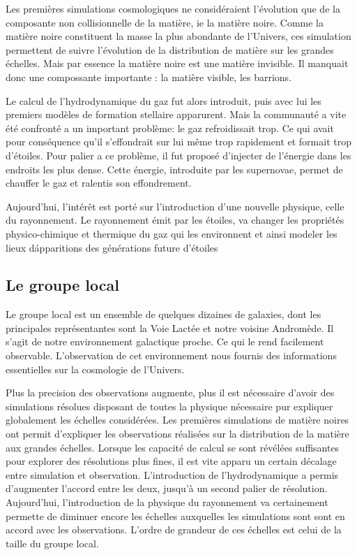 Les premières simulations cosmologiques ne considéraient l'évolution que de la composante non collisionnelle de la matière, ie la matière noire.
Comme la matière noire constituent la masse la plus abondante de l'Univers, ces simulation permettent de suivre l'évolution de la distribution de matière sur les grandes échelles. 
Mais par essence la matière noire est une matière invisible. 
Il manquait donc une compossante importante : la matière visible, les barrions.

Le calcul de l'hydrodynamique du gaz fut alors introduit, puis avec lui les premiers modèles de formation stellaire apparurent.
Mais la communauté a vite été confronté a un important problème: le gaz refroidissait trop.
Ce qui avait pour conséquence qu'il s'effondrait sur lui même trop rapidement et formait trop d'étoiles.
Pour palier a ce problème, il fut proposé d'injecter de l'énergie dans les endroits les plus dense.
Cette énergie, introduite par les supernovae, permet de chauffer le gaz et ralentis son effondrement. 

Aujourd'hui, l'intérêt est porté sur l'introduction d'une nouvelle physique, celle du rayonnement.
Le rayonnement émit par les étoiles, va changer les propriétés physico-chimique et thermique du gaz qui les environnent et ainsi modeler les lieux d\'apparitions des générations future d'étoiles


\subsection*{Le groupe local}
Le groupe local est un ensemble de quelques dizaines de galaxies, dont les principales représentantes sont la Voie Lactée et notre voisine Andromède.
Il s'agit de notre environnement galactique proche.
Ce qui le rend facilement observable.
L'observation de cet environnement nous fournis des informations essentielles sur la cosmologie de l'Univers.

Plus la precision des observations augmente, plus il est nécessaire d'avoir des simulations résolues disposant de toutes la physique nécessaire pur expliquer globalement les échelles considérées.
Les premières simulations de matière noires ont permit d'expliquer les observations réalisées sur la distribution de la matière aux grandes échelles.
Lorsque les capacité de calcul se sont révélées suffisantes pour explorer des résolutions plus fines, il est vite apparu un certain décalage entre simulation et observation. 
L'introduction de l'hydrodynamique a permis d'augmenter l'accord entre les deux, jusqu'à un second palier de résolution.
Aujourd'hui, l'introduction de la physique du rayonnement va certainement permette de diminuer encore les échelles auxquelles les simulations sont sont en accord avec les observations.
L'ordre de grandeur de ces échelles est celui de la taille du groupe local.

